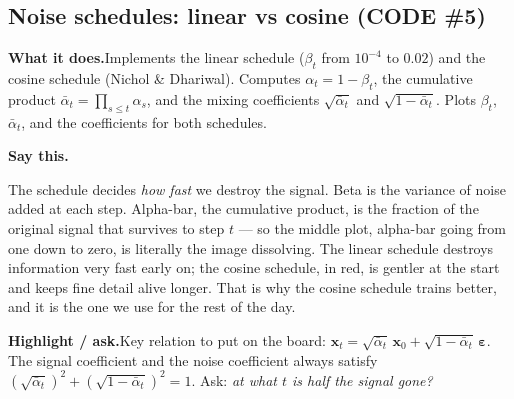 \documentclass[11pt]{article}
\newenvironment{saythis}{%
  \par\smallskip\noindent
  \begin{list}{}{%
    \setlength{\leftmargin}{1.2em}%
    \setlength{\rightmargin}{0.5em}%
    \setlength{\topsep}{2pt}%
  }\item\relax
  \color{sayrule}\textbf{Say this.}\hspace{0.4em}\color{black}\itshape
}{%
  \end{list}\par\smallskip
}
\newcommand{\highlight}[1]{\par\smallskip\noindent\textcolor{hlcolor}{\textbf{Highlight / ask.}}\hspace{0.4em}#1\par\smallskip}
\newcommand{\whatdoes}[1]{\par\noindent\textbf{What it does.}\hspace{0.4em}#1\par}
\begin{document}
\subsection{Noise schedules: linear vs cosine (CODE \#5)}
\whatdoes{Implements the linear schedule ($\beta_t$ from $10^{-4}$ to $0.02$) and the cosine schedule
(Nichol \& Dhariwal). Computes $\alpha_t = 1-\beta_t$, the cumulative product
$\bar{\alpha}_t = \prod_{s\le t}\alpha_s$, and the mixing coefficients $\sqrt{\bar\alpha_t}$ and
$\sqrt{1-\bar\alpha_t}$. Plots $\beta_t$, $\bar\alpha_t$, and the coefficients for both schedules.}
\begin{saythis}
The schedule decides \emph{how fast} we destroy the signal. Beta is the variance of noise added at each
step. Alpha-bar, the cumulative product, is the fraction of the original signal that survives to step
$t$ --- so the middle plot, alpha-bar going from one down to zero, is literally the image dissolving.
The linear schedule destroys information very fast early on; the cosine schedule, in red, is gentler at
the start and keeps fine detail alive longer. That is why the cosine schedule trains better, and it is
the one we use for the rest of the day.
\end{saythis}
\highlight{Key relation to put on the board:
$\mathbf{x}_t = \sqrt{\bar\alpha_t}\,\mathbf{x}_0 + \sqrt{1-\bar\alpha_t}\,\boldsymbol\varepsilon$.
The signal coefficient and the noise coefficient always satisfy
$(\sqrt{\bar\alpha_t})^2 + (\sqrt{1-\bar\alpha_t})^2 = 1$. Ask: \emph{at what $t$ is half the signal
gone?}}
\end{document}
